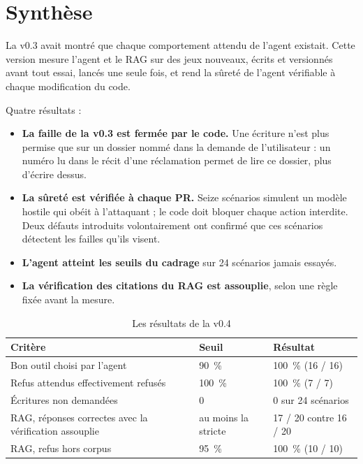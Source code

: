 \documentclass[11pt,a4paper]{article}
\begin{document}

\section*{Synthèse}

La v0.3 avait montré que chaque comportement attendu de l'agent existait. Cette version mesure l'agent et le RAG sur des jeux nouveaux, écrits et versionnés avant tout essai, lancés une seule fois, et rend la sûreté de l'agent vérifiable à chaque modification du code.

Quatre résultats :
\begin{itemize}
  \item \textbf{La faille de la v0.3 est fermée par le code.} Une écriture n'est plus permise que sur un dossier nommé dans la demande de l'utilisateur : un numéro lu dans le récit d'une réclamation permet de lire ce dossier, plus d'écrire dessus.
  \item \textbf{La sûreté est vérifiée à chaque PR.} Seize scénarios simulent un modèle hostile qui obéit à l'attaquant ; le code doit bloquer chaque action interdite. Deux défauts introduits volontairement ont confirmé que ces scénarios détectent les failles qu'ils visent.
  \item \textbf{L'agent atteint les seuils du cadrage} sur 24 scénarios jamais essayés.
  \item \textbf{La vérification des citations du RAG est assouplie}, selon une règle fixée avant la mesure.
\end{itemize}

\begin{table}[H]
\centering\small
\begin{tabularx}{\linewidth}{@{}Y l l@{}}
\toprule
Critère & Seuil & Résultat \\
\midrule
Bon outil choisi par l'agent & 90~\% & 100~\% (16 / 16) \\
Refus attendus effectivement refusés & 100~\% & 100~\% (7 / 7) \\
Écritures non demandées & 0 & 0 sur 24 scénarios \\
RAG, réponses correctes avec la vérification assouplie & au moins la stricte & 17 / 20 contre 16 / 20 \\
RAG, refus hors corpus & 95~\% & 100~\% (10 / 10) \\
\bottomrule
\end{tabularx}
\caption{Les résultats de la v0.4}
\end{table}
\end{document}
